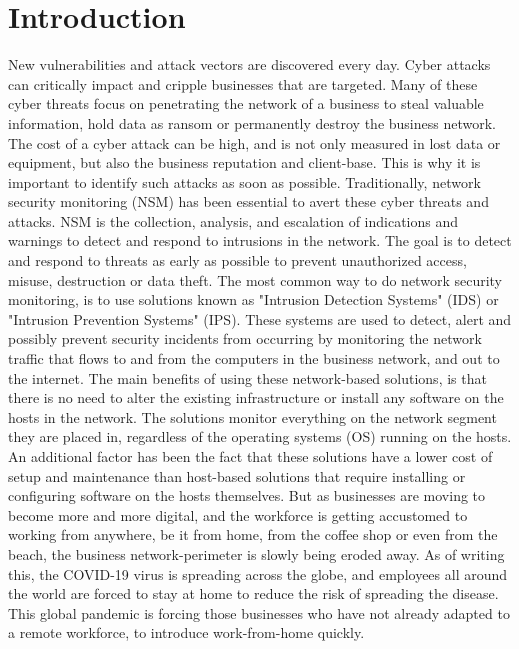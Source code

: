 \chapter{Introduction}
\label{chap:introduction}

\iffalse
Scrutiny of the introduction - http://sepwww.stanford.edu/sep/prof/Intro.html
\fi

New vulnerabilities and attack vectors are discovered every day. Cyber attacks can critically impact and cripple businesses that are targeted. Many of these cyber threats focus on penetrating the network of a business to steal valuable information, hold data as ransom or permanently destroy the business network. The cost of a cyber attack can be high, and is not only measured in lost data or equipment, but also the business reputation and client-base. This is why it is important to identify such attacks as soon as possible.
Traditionally, network security monitoring (NSM) has been essential to avert these cyber threats and attacks. 
NSM is the collection, analysis, and escalation of indications and warnings to detect and respond to intrusions in the network. The goal is to detect and respond to threats as early as possible to prevent unauthorized access, misuse, destruction or data theft.
The most common way to do network security monitoring, is to use solutions known as "Intrusion Detection Systems" (IDS) or "Intrusion Prevention Systems" (IPS). These systems are used to detect, alert and possibly prevent security incidents from occurring by monitoring the network traffic that flows to and from the computers in the business network, and out to the internet. The main benefits of using these network-based solutions, is that there is no need to alter the existing infrastructure or install any software on the hosts in the network. The solutions monitor everything on the network segment they are placed in, regardless of the operating systems (OS) running on the hosts. An additional factor has been the fact that these solutions have a lower cost of setup and maintenance than host-based solutions that require installing or configuring software on the hosts themselves.
But as businesses are moving to become more and more digital, and the workforce is getting accustomed to working from anywhere, be it from home, from the coffee shop or even from the beach, the business network-perimeter is slowly being eroded away.
As of writing this, the COVID-19 virus is spreading across the globe, and employees all around the world are forced to stay at home to reduce the risk of spreading the disease. This global pandemic is forcing those businesses who have not already adapted to a remote workforce, to introduce work-from-home quickly.
